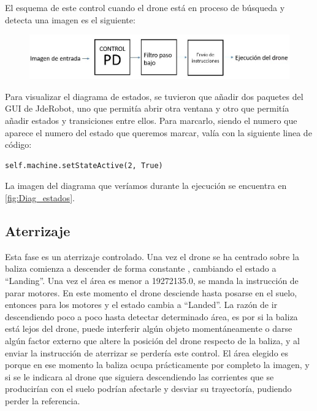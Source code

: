 \hspace{1 cm} El esquema de este control cuando el drone est\'a en proceso de b\'usqueda y detecta una imagen es el siguiente:
\begin{figure}[ht]
	\centering
		\includegraphics[width=1\textwidth]{imgs/esquemapd2.png}
	\label{fig:Esquema_control}
\end{figure}


\hspace{1cm} Para visualizar el diagrama de estados, se tuvieron que añadir dos paquetes del GUI de JdeRobot, uno que permit\'ia abrir otra ventana y otro que permit\'ia añadir estados y transiciones entre ellos. Para marcarlo, siendo el numero que aparece el numero del estado que queremos marcar, val\'ia con la siguiente linea de c\'odigo:

\begin{lstlisting}[backgroundcolor=\color{yellow}]
self.machine.setStateActive(2, True)
\end{lstlisting}
	
\hspace{1cm}La imagen del diagrama que ver\'iamos durante la ejecuci\'on se encuentra en \ref{fig:Diag_estados}.

\subsection{Aterrizaje}

\hspace{1 cm} Esta fase es un aterrizaje controlado. Una vez el drone se ha centrado sobre la baliza comienza a descender de forma constante , cambiando el estado a "`Landing"'. Una vez el \'area es menor a 19272135.0, se manda la instrucci\'on de parar motores. En este momento el drone desciende hasta posarse en el suelo, entonces para los motores y el estado cambia a "`Landed"'. La raz\'on de ir descendiendo poco a poco hasta detectar determinado \'area, es por si la baliza est\'a lejos del drone, puede interferir alg\'un objeto moment\'aneamente o darse alg\'un factor externo que altere la posici\'on del drone respecto de la baliza, y al enviar la instrucci\'on de aterrizar se perder\'ia este control. El \'area elegido es porque en ese momento la baliza ocupa pr\'acticamente por completo la imagen, y si se le indicara al drone que siguiera descendiendo las corrientes que se producir\'ian con el suelo podr\'ian afectarle y desviar su trayector\'ia, pudiendo perder la referencia.


